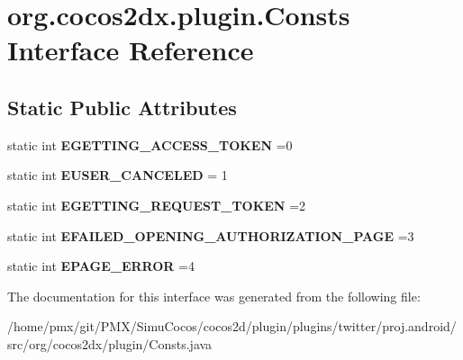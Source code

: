 \hypertarget{interfaceorg_1_1cocos2dx_1_1plugin_1_1Consts}{}\section{org.\+cocos2dx.\+plugin.\+Consts Interface Reference}
\label{interfaceorg_1_1cocos2dx_1_1plugin_1_1Consts}
\subsection*{Static Public Attributes}
\begin{DoxyCompactItemize}
\item 
\mbox{\label{interfaceorg_1_1cocos2dx_1_1plugin_1_1Consts_a466fb4142878312880147fbbc2906224}} 
static int {\bfseries E\+G\+E\+T\+T\+I\+N\+G\+\_\+\+A\+C\+C\+E\+S\+S\+\_\+\+T\+O\+K\+EN} =0
\item 
\mbox{\label{interfaceorg_1_1cocos2dx_1_1plugin_1_1Consts_ad20abc68bfd2f13ff21ee4c71be4c955}} 
static int {\bfseries E\+U\+S\+E\+R\+\_\+\+C\+A\+N\+C\+E\+L\+ED} = 1
\item 
\mbox{\label{interfaceorg_1_1cocos2dx_1_1plugin_1_1Consts_a5ea35c74fd2421342612edc5127e5c9b}} 
static int {\bfseries E\+G\+E\+T\+T\+I\+N\+G\+\_\+\+R\+E\+Q\+U\+E\+S\+T\+\_\+\+T\+O\+K\+EN} =2
\item 
\mbox{\label{interfaceorg_1_1cocos2dx_1_1plugin_1_1Consts_afa6543264f8f2ef709ef7ffb152941fe}} 
static int {\bfseries E\+F\+A\+I\+L\+E\+D\+\_\+\+O\+P\+E\+N\+I\+N\+G\+\_\+\+A\+U\+T\+H\+O\+R\+I\+Z\+A\+T\+I\+O\+N\+\_\+\+P\+A\+GE} =3
\item 
\mbox{\label{interfaceorg_1_1cocos2dx_1_1plugin_1_1Consts_ac57893a9c61502a44b39605344e4145b}} 
static int {\bfseries E\+P\+A\+G\+E\+\_\+\+E\+R\+R\+OR} =4
\end{DoxyCompactItemize}


The documentation for this interface was generated from the following file\+:\begin{DoxyCompactItemize}
\item 
/home/pmx/git/\+P\+M\+X/\+Simu\+Cocos/cocos2d/plugin/plugins/twitter/proj.\+android/src/org/cocos2dx/plugin/Consts.\+java\end{DoxyCompactItemize}
